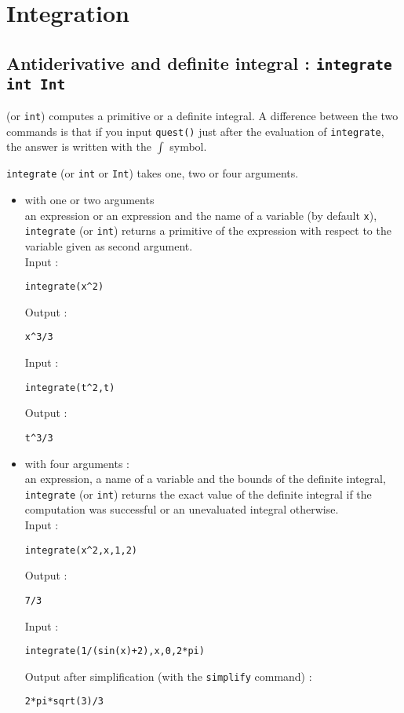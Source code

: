 \documentclass[a4paper,11pt]{book}
\begin{document}
\section{Integration}
\subsection{Antiderivative and definite integral : {\tt integrate int Int}}
 (or {\tt int}) computes a primitive
or a definite integral. A difference between the two 
commands is that if you input {\tt quest()} just after the evaluation of 
{\tt  integrate}, the answer is written with the $\int$ symbol.

{\tt integrate} (or {\tt int} or {\tt Int}) takes one, two or four arguments.
\begin{itemize}
\item with one or two arguments\\
an expression or an expression and 
the name of a variable (by default {\tt x}),\\
{\tt integrate} (or {\tt int}) returns a primitive of the expression with 
respect to the  variable given as second argument.\\
Input :
\begin{center}{\tt integrate(x\verb|^|2)}\end{center}
Output  :
\begin{center}{\tt x\verb|^|3/3}\end{center}
Input :
\begin{center}{\tt integrate(t\verb|^|2,t)}\end{center}
Output  :
\begin{center}{\tt t\verb|^|3/3}\end{center}
\item with four arguments :\\
an expression, a name of a variable and the bounds of the definite integral,\\ 
{\tt integrate} (or {\tt int}) returns the exact
value of the definite integral if the computation was successful or
an unevaluated integral otherwise.\\
Input :
\begin{center}{\tt integrate(x\verb|^|2,x,1,2)}\end{center}
Output  :
\begin{center}{\tt 7/3}\end{center}
Input :
\begin{center}{\tt integrate(1/(sin(x)+2),x,0,2*pi)}\end{center}
Output  after simplification (with the {\tt simplify} command) :
\begin{center}{\tt 2*pi*sqrt(3)/3}\end{center}
\end{itemize}
\end{document}
